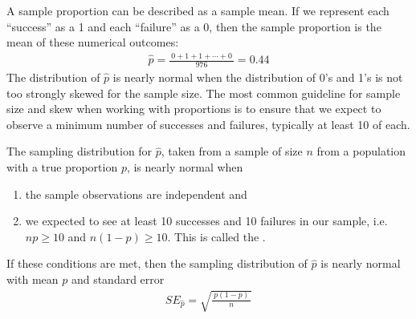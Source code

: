 A sample proportion can be described as a sample mean. If we represent each ``success'' as a 1 and each ``failure'' as a 0, then the sample proportion is the mean of these numerical outcomes:
\begin{eqnarray*}
\hat{p} = \frac{\ 0 + 1 + 1 + \cdots + 0\ }{976} = 0.44
\end{eqnarray*}
The distribution of $\hat{p}$ is nearly normal when the distribution of 0's and 1's is not too strongly skewed for the sample size. The most common guideline for sample size and skew when working with proportions is to ensure that we expect to observe a minimum number of successes and failures, typically at least 10 of each.

\begin{termBox}{
The sampling distribution for $\hat{p}$, taken from a sample of size $n$ from a population with a true proportion $p$, is nearly normal when
\begin{enumerate}
\item the sample observations are independent and
\item we expected to see at least 10 successes and 10 failures in our sample, i.e. $np\geq10$ and $n(1-p)\geq10$. This is called the .
\end{enumerate}
If these conditions are met, then the sampling distribution of $\hat{p}$ is nearly normal with mean $p$ and standard error
\begin{eqnarray}
SE_{\hat{p}} = \sqrt{\frac{\ p(1-p)\ }{n}}
\label{seOfPHat}
\end{eqnarray}}
\end{termBox}

